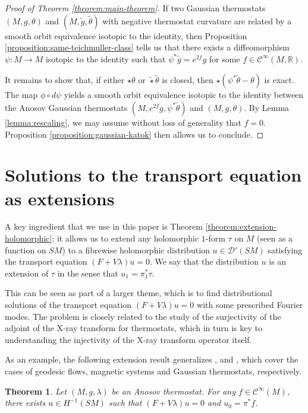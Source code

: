 \documentclass[reqno,12pt,letterpaper]{amsart}
\newtheorem{theorem}[proposition]{Theorem}
\theoremstyle{definition}
\theoremstyle{remark}
\theoremstyle{definition}
\numberwithin{equation}{section}
\newcommand{\R}{\mathbb{R}}
\begin{document}
\begin{proof}[Proof of Theorem \ref{theorem:main-theorem}]
If two Gaussian thermostats $(M, g, \theta)$ and $(M, \tilde{g}, \tilde{\theta})$ with negative thermostat curvature are related by a smooth orbit equivalence isotopic to the identity, then Proposition \ref{proposition:same-teichmuller-class} tells us that there exists a diffeomorphism $\psi : M\to M$ isotopic to the identity such that $\psi^*\tilde{g}=e^{2f}g$ for some $f\in \mathcal{C}^\infty(M, \R)$. 

It remains to show that, if either $\star\theta$ or $\tilde{\star}\tilde{\theta}$ is closed, then $\star(\psi^*\tilde{\theta}- \theta)$ is exact.  The map $\phi \circ d\psi$ yields a smooth orbit equivalence isotopic to the identity between the Anosov Gaussian thermostats $(M, e^{2f}g, \psi^*\tilde{\theta})$ and $(M, g, \theta)$. By Lemma \ref{lemma:rescaling}, we may assume without loss of generality that $f=0$. Proposition \ref{proposition:gaussian-katok} then allows us to conclude.
\end{proof}

\appendix \section{Solutions to the transport equation as extensions}\label{appendix:A}

A key ingredient that we use in this paper is Theorem \ref{theorem:extension-holomorphic}: it allows us to extend any holomorphic $1$-form $\tau$ on $M$ (seen as a function on $SM$) to a fibrewise holomorphic distribution $u\in \mathcal{D}'(SM)$ satisfying the transport equation $(F+V\lambda)u=0$. We say that the distribution $u$ is an extension of $\tau$ in the sense that $u_1 = \pi_1^*\tau$. 

This can be seen as part of a larger theme, which is to find distributional solutions of the transport equation $(F+V\lambda)u=0$ with some prescribed Fourier modes. The problem is closely related to the study of the surjectivity of the adjoint of the X-ray transform for thermostats, which in turn is key to understanding the injectivity of the X-ray transform operator itself. 

As an example, the following extension result generalizes \cite[Theorem 1.4]{paternain14}, \cite[Theorem 1.6]{ainsworth15} and \cite[Theorem 1.7]{assylbekov17}, which cover the cases of geodesic flows, magnetic systems and Gaussian thermostats, respectively.
\begin{theorem}\label{theorem:extension-functions}
Let $(M, g, \lambda)$ be an Anosov thermostat. For any $f\in \mathcal{C}^\infty(M)$, there exists $u\in H^{-1}(SM)$ such that $(F+V\lambda)u=0$ and $u_0 = \pi^*f$. 
\end{theorem}
\end{document}
